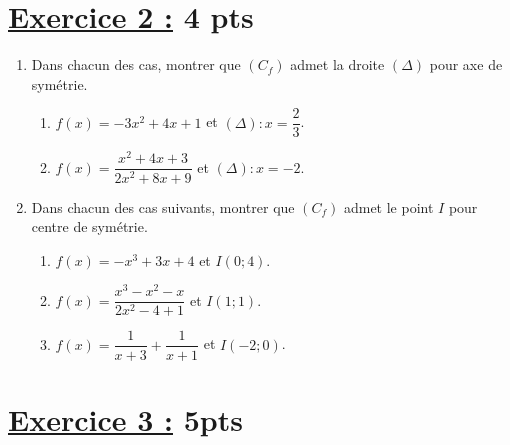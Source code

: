 \documentclass[12pt,a4paper]{article}
\begin{document}
\section*{\underline{Exercice 2 :} 4 pts }

\begin{enumerate}
    \item  Dans chacun des cas, montrer que \( (C_f) \) admet la droite \( (\Delta) \) pour axe de symétrie.

\begin{enumerate}
    \item \( f(x) = -3x^2 + 4x + 1 \) et \( (\Delta) : x = \dfrac{2}{3} \).
    \item \( f(x) = \dfrac{x^2 + 4x + 3}{2x^2 + 8x + 9} \) et \( (\Delta) : x = -2 \).
\end{enumerate}

\item  Dans chacun des cas suivants, montrer que \( (C_f) \) admet le point \( I \) pour centre de symétrie.

\begin{enumerate}
    \item \( f(x) = -x^3 + 3x + 4 \) et \( I(0;4) \).
    \item \( f(x) = \dfrac{x^3 - x^2 - x}{2x^2 - 4 + 1} \) et \( I(1;1) \).
    \item \( f(x) = \dfrac{1}{x+3} + \dfrac{1}{x+1} \) et \( I(-2;0) \).
\end{enumerate}

\end{enumerate}

\section*{\underline{Exercice 3 :} 5pts }
\end{document}
